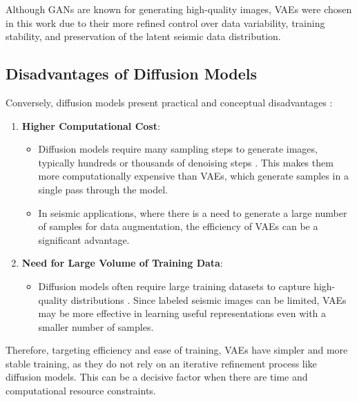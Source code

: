 \documentclass{ieeeaccess}
\providecommand{\DIFadd}[1]{{\protect\color{blue}\uwave{#1}}} %
\providecommand{\DIFaddbegin}{} %
\providecommand{\DIFaddend}{} %
\newcommand{\DIFaddincludegraphics}[2][]{{\color{blue}\fbox{\DIFOincludegraphics[#1]{#2}}}} %
\DeclareRobustCommand{\DIFaddbegin}{\DIFOaddbegin \let\includegraphics\DIFaddincludegraphics} %
\DeclareRobustCommand{\DIFaddend}{\DIFOaddend \let\includegraphics\DIFOincludegraphics} %
\begin{document}
Although GANs are known for generating high-quality images, VAEs were chosen in this work due to their more refined control over data variability, training stability, and preservation of the latent seismic data distribution.

\subsection*{Disadvantages of Diffusion Models}
Conversely, diffusion models present practical and conceptual disadvantages \cite{ref17}:
\begin{enumerate}
    \item \textbf{Higher Computational Cost}:
    \begin{itemize}
        \item Diffusion models require many sampling steps to generate images, typically hundreds or thousands of denoising steps \DIFaddbegin \DIFadd{\mbox{%
\cite{ref17}}\hskip0pt%
}\DIFaddend . This makes them more computationally expensive than VAEs, which generate samples in a single pass through the model.
        \item In seismic applications, where there is a need to generate a large number of samples for data augmentation, the efficiency of VAEs can be a significant advantage. 
    \end{itemize}
    \item \textbf{Need for Large Volume of Training Data}:
    \begin{itemize}
        \item Diffusion models often require large training datasets to capture high-quality distributions  \DIFaddbegin \DIFadd{\mbox{%
\cite{ref17}}\hskip0pt%
}\DIFaddend . Since labeled seismic images can be limited, VAEs may be more effective in learning useful representations even with a smaller number of samples.
    \end{itemize}
\end{enumerate}

Therefore, targeting efficiency and ease of training, VAEs have simpler and more stable training, as they do not rely on an iterative refinement process like diffusion models. This can be a decisive factor when there are time and computational resource constraints.

\end{document}
